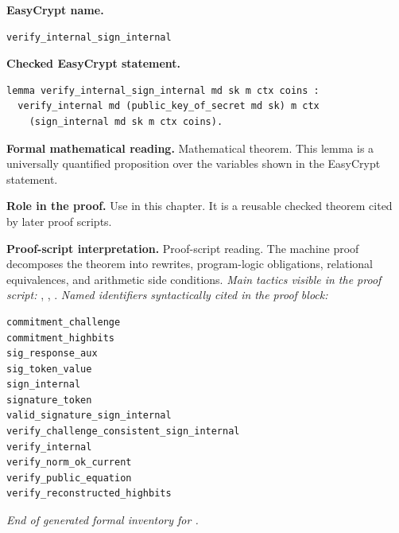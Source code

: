 \begin{formaltheorem}
\noindent\textbf{EasyCrypt name.}
\begin{lstlisting}[language=EasyCrypt,basicstyle=\ttfamily\scriptsize]
verify_internal_sign_internal
\end{lstlisting}
\noindent\textbf{Checked EasyCrypt statement.}
\begin{lstlisting}[language=EasyCrypt,basicstyle=\ttfamily\scriptsize]
lemma verify_internal_sign_internal md sk m ctx coins :
  verify_internal md (public_key_of_secret md sk) m ctx
    (sign_internal md sk m ctx coins).
\end{lstlisting}
\noindent\textbf{Formal mathematical reading.}
Mathematical theorem. This lemma is a universally quantified proposition over the variables shown in the EasyCrypt statement.

\noindent\textbf{Role in the proof.}
Use in this chapter. It is a reusable checked theorem cited by later proof scripts.

\noindent\textbf{Proof-script interpretation.}
Proof-script reading. The machine proof decomposes the theorem into rewrites, program-logic obligations, relational equivalences, and arithmetic side conditions.
\emph{Main tactics visible in the proof script:} , , .
\emph{Named identifiers syntactically cited in the proof block:}
\begin{lstlisting}[language=EasyCrypt,basicstyle=\ttfamily\scriptsize]
commitment_challenge
commitment_highbits
sig_response_aux
sig_token_value
sign_internal
signature_token
valid_signature_sign_internal
verify_challenge_consistent_sign_internal
verify_internal
verify_norm_ok_current
verify_public_equation
verify_reconstructed_highbits
\end{lstlisting}

\end{formaltheorem}

\medskip
\noindent\emph{End of generated formal inventory for .}
